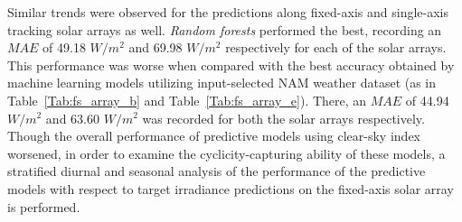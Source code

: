 \par Similar trends were observed for the predictions along fixed-axis and single-axis tracking solar arrays as well. \textit{Random forests} performed the best, recording an $MAE$ of 49.18 $W/m^2$ and 69.98 $W/m^2$ respectively for each of the solar arrays. This performance was worse when compared with the best accuracy obtained by machine learning models utilizing input-selected NAM weather dataset (as in Table~\ref{Tab:fs_array_b} and Table~\ref{Tab:fs_array_e}). There, an $MAE$ of 44.94 $W/m^2$ and 63.60 $W/m^2$ was recorded for both the solar arrays respectively. Though the overall performance of predictive models using clear-sky index worsened, in order to examine the cyclicity-capturing ability of these models, a stratified diurnal and seasonal analysis of the performance of the predictive models with respect to target irradiance predictions on the fixed-axis solar array is performed. 

